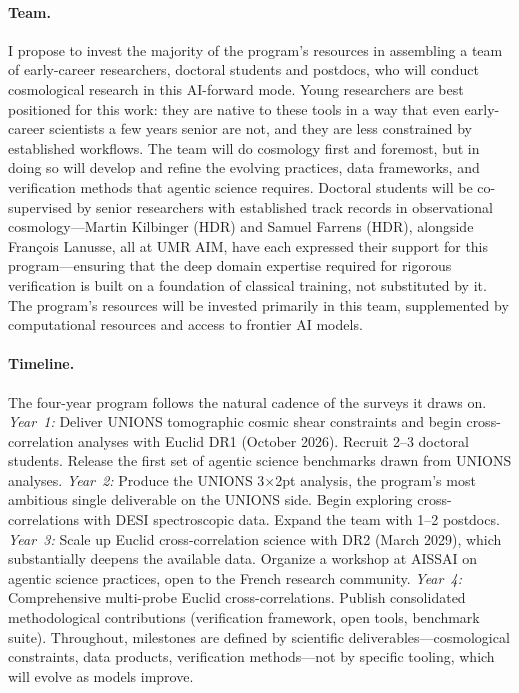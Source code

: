 \documentclass[11pt, a4paper]{article}
\begin{document}
\paragraph{Team.}
I propose to invest the majority of the program's resources in assembling a team of early-career researchers, doctoral students and postdocs, who will conduct cosmological research in this AI-forward mode.
Young researchers are best positioned for this work: they are native to these tools in a way that even early-career scientists a few years senior are not, and they are less constrained by established workflows.
The team will do cosmology first and foremost, but in doing so will develop and refine the evolving practices, data frameworks, and verification methods that agentic science requires.
Doctoral students will be co-supervised by senior researchers with established track records in observational cosmology---Martin Kilbinger (HDR) and Samuel Farrens (HDR), alongside Fran\c{c}ois Lanusse, all at UMR AIM, have each expressed their support for this program---ensuring that the deep domain expertise required for rigorous verification is built on a foundation of classical training, not substituted by it.
The program's resources will be invested primarily in this team, supplemented by computational resources and access to frontier AI models.

\paragraph{Timeline.}
The four-year program follows the natural cadence of the surveys it draws on.
\textit{Year~1:} Deliver UNIONS tomographic cosmic shear constraints and begin cross-correlation analyses with Euclid DR1 (October 2026).
Recruit 2--3 doctoral students.
Release the first set of agentic science benchmarks drawn from UNIONS analyses.
\textit{Year~2:} Produce the UNIONS 3$\times$2pt analysis, the program's most ambitious single deliverable on the UNIONS side.
Begin exploring cross-correlations with DESI spectroscopic data.
Expand the team with 1--2 postdocs.
\textit{Year~3:} Scale up Euclid cross-correlation science with DR2 (March 2029), which substantially deepens the available data.
Organize a workshop at AISSAI on agentic science practices, open to the French research community.
\textit{Year~4:} Comprehensive multi-probe Euclid cross-correlations.
Publish consolidated methodological contributions (verification framework, open tools, benchmark suite).
Throughout, milestones are defined by scientific deliverables---cosmological constraints, data products, verification methods---not by specific tooling, which will evolve as models improve.
\end{document}
